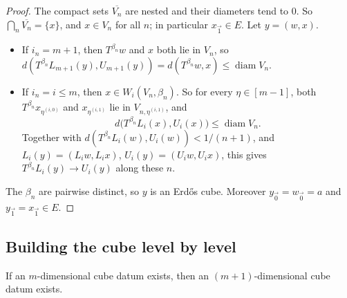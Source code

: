 \begin{proof}
The compact sets $\overline{V_n}$ are nested and their diameters tend to $0$. So
$\bigcap_n\overline{V_n}=\{x\}$, and $x\in V_n$ for all $n$; in particular $x_{\vec1}\in E$.
Let $y=(w,x)$.
\begin{itemize}
\item If $i_n=m+1$, then $T^{\beta_n}w$ and $x$ both lie in $V_n$, so
$d(T^{\beta_n}L_{m+1}(y),U_{m+1}(y))=d(T^{\beta_n}w,x)\le\operatorname{diam}V_n$.
\item If $i_n=i\le m$, then $x\in W_i(V_n,\beta_n)$. So for every $\eta\in[m-1]$,
both $T^{\beta_n}x_{\eta^{(i,0)}}$ and $x_{\eta^{(i,1)}}$ lie in $V_{n,\eta^{(i,1)}}$, and
\[
d\big(T^{\beta_n}L_i(x),U_i(x)\big)\le\operatorname{diam}V_n .
\]
Together with $d(T^{\beta_n}L_i(w),U_i(w))<1/(n+1)$, and $L_i(y)=(L_iw,L_ix)$,
$U_i(y)=(U_iw,U_ix)$, this gives $T^{\beta_n}L_i(y)\to U_i(y)$ along these $n$.
\end{itemize}
The $\beta_n$ are pairwise distinct, so $y$ is an Erdős cube. Moreover $y_{\vec0}=w_{\vec0}=a$
and $y_{\vec1}=x_{\vec1}\in E$.
\end{proof}

\subsection{Building the cube level by level}\label{K:ssec:induction}

\begin{proposition}\label{K:prop:step}
If an $m$-dimensional cube datum exists, then an $(m+1)$-dimensional cube datum exists.
\end{proposition}

